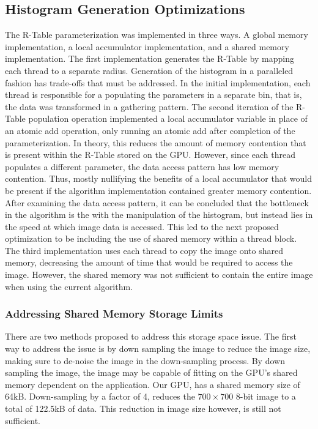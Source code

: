 \documentclass[12pt]{article}
\begin{document}
\subsection*{Histogram Generation Optimizations}
The R-Table parameterization was implemented in three ways. A global memory implementation, a local accumulator implementation, and a shared memory implementation.
The first implementation generates the R-Table by mapping each thread to a separate radius.
Generation of the histogram in a paralleled fashion has trade-offs that must be addressed. 
In the initial implementation, each thread is responsible for a populating the parameters in a separate bin, that is, the data was transformed in a gathering pattern. 
The second iteration of the R-Table population operation implemented a local accumulator variable in place of an atomic add operation, only running an atomic add after completion of the parameterization.
In theory, this reduces the amount of memory contention that is present within the R-Table stored on the GPU\@.
However, since each thread populates a different parameter, the data access pattern has low memory contention.
Thus, mostly nullifying the benefits of a local accumulator that would be present if the algorithm implementation contained greater memory contention.
After examining the data access pattern, it can be concluded that the bottleneck in the algorithm is the with the manipulation of the histogram, but instead lies in the speed at which image data is accessed.
This led to the next proposed optimization to be including the use of shared memory within a thread block.
The third implementation uses each thread to copy the image onto shared memory, decreasing the amount of time that would be required to access the image.
However, the shared memory was not sufficient to contain the entire image when using the current algorithm.

\subsubsection*{Addressing Shared Memory Storage Limits}
There are two methods proposed to address this storage space issue. 
The first way to address the issue is by down sampling the image to reduce the image size, making sure to de-noise the image in the down-sampling process. 
By down sampling the image, the image may be capable of fitting on the GPU's shared memory dependent on the application.
Our GPU, has a shared memory size of 64kB.
Down-sampling by a factor of 4, reduces the $700 \times 700$ 8-bit image to a total of 122.5kB of data. 
This reduction in image size however, is still not sufficient. 
\end{document}
